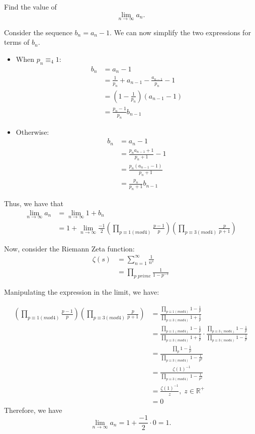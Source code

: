 \documentclass{article}
\begin{document}
\begin{enumerate}
{Find the value of 
$$\lim_{n \to \infty} a_n.$$
}

Consider the sequence $b_n = a_n - 1$. We can now simplify the two expressions for terms of $b_n$.

\begin{itemize}
	\item When $p_n \equiv _4 1$:
	\begin{align*}
		b_n &= a_n - 1 \\ 
		&= \frac{1}{p_n} + a_{n - 1} - \frac{a_{n - 1}}{p_n} - 1 \\
        &= (1 - \frac{1}{p_n})(a_{n - 1} - 1) \\
        &= \frac{p_n - 1}{p_n} b_{n - 1}
	\end{align*}	
	 
	\item Otherwise:
	\begin{align*}
		b_n &= a_n - 1 \\ 
		&= \frac{p_n a_{n - 1} + 1}{p_n + 1} - 1 \\
        &= \frac{p_n(a_{n - 1} - 1)}{p_n + 1} \\
        &= \frac{p_n}{p_n + 1} b_{n - 1}
	\end{align*}	
\end{itemize}

Thus, we have that
\begin{align*}
\lim_{n \rightarrow \infty} a_n &= \lim_{n \rightarrow \infty} 1 + b_n \\
&= 1 + \lim_{n \rightarrow \infty} \frac{-1}{2} (\prod_{p \equiv 1 (mod 4)} \frac{p - 1}{p}) (\prod_{p \equiv 3 (mod 4)} \frac{p}{p + 1})
\end{align*}

Now, consider the Riemann Zeta function:
\begin{align*}
    \zeta (s) &= \sum_{n = 1}^{\infty} \frac{1}{n^s} \\
    &= \prod_{p \; prime} \frac{1}{1 - p^{-s}}
\end{align*}

Manipulating the expression in the limit, we have:

\begin{align*}
    (\prod_{p \equiv 1 (mod 4)} \frac{p - 1}{p}) (\prod_{p \equiv 3 (mod 4)} \frac{p}{p + 1}) &= \frac{\prod_{p \equiv 1 (mod 4)} 1 - \frac{1}{p}}{\prod_{p \equiv 3 (mod 4)} 1 + \frac{1}{p}}\\
    &= \frac{\prod_{p \equiv 1 (mod 4)} 1 - \frac{1}{p}}{\prod_{p \equiv 3 (mod 4)} 1 + \frac{1}{p}} \cdot \frac{\prod_{p \equiv 3 (mod 4)} 1 - \frac{1}{p}}{\prod_{p \equiv 3 (mod 4)} 1 - \frac{1}{p}}\\
    &= \frac{\prod_{p} 1 - \frac{1}{p}}{\prod_{p \equiv 3 (mod 4)} 1 - \frac{1}{p^2}}\\
    &= \frac{\zeta(1)^{-1}}{\prod_{p \equiv 3 (mod 4)} 1 - \frac{1}{p^2}} \\
    &= \frac{\zeta(1)^{-1}}{z}, \; z \in \mathbb{R}^{+}\\
    &= 0
\end{align*}
    Therefore, we have
$$\lim_{n \rightarrow \infty} a_n = 1 + \frac{-1}{2} \cdot 0 = 1.$$
\end{enumerate}
\end{document}
